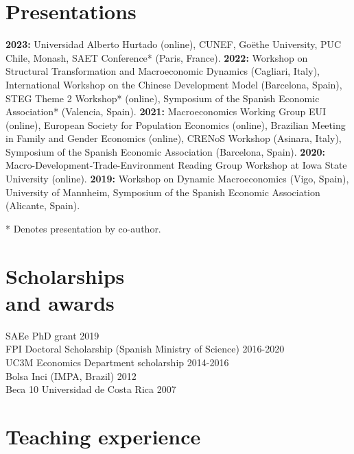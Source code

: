 \documentclass[margin]{res} %
\begin{document}
\begin{resume}
\section{Presentations}

{\bf 2023:} Universidad Alberto Hurtado (online), CUNEF, Go\"ethe University, PUC Chile, Monash, SAET Conference* (Paris, France). {\bf 2022:} Workshop on Structural Transformation and Macroeconomic Dynamics (Cagliari, Italy), International Workshop on the Chinese Development Model (Barcelona, Spain), STEG Theme 2 Workshop* (online), Symposium of the Spanish Economic Association* (Valencia, Spain). {\bf 2021:} Macroeconomics Working Group EUI (online), European Society for Population Economics (online), Brazilian Meeting in Family and Gender Economics (online), CRENoS Workshop (Asinara, Italy), Symposium of the Spanish Economic Association (Barcelona, Spain). {\bf 2020:} Macro-Development-Trade-Environment Reading Group Workshop at Iowa State University (online). {\bf 2019:} Workshop on Dynamic Macroeconomics (Vigo, Spain), University of Mannheim, Symposium of the Spanish Economic Association (Alicante, Spain).

* Denotes presentation by co-author.


\section{Scholarships \\ and awards} 

SAEe PhD grant \hfill 2019\\
FPI Doctoral Scholarship (Spanish Ministry of Science) \hfill 2016-2020 \\
UC3M Economics Department scholarship \hfill 2014-2016 \\
Bolsa Inci (IMPA, Brazil) \hfill 2012 \\
Beca 10 Universidad de Costa Rica \hfill 2007


\section{Teaching experience}


\end{resume}
\end{document}
